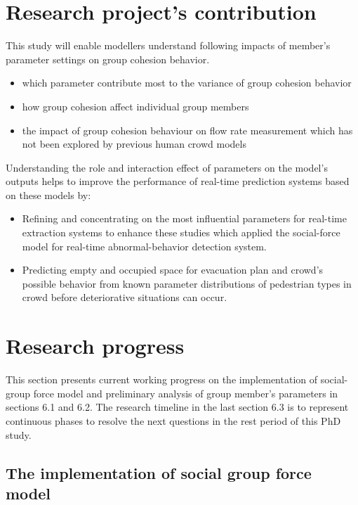 \documentclass[a4paper,11pt,phdthesis,singlespace,twoside]{cssethesis}
\begin{document}
\chapter{Research project's contribution}
\let\cleardoublepage\clearpage
This study will enable modellers understand following impacts of member's parameter settings on group cohesion behavior.
\begin{itemize}
	\item which parameter contribute most to the variance of group cohesion behavior
	\item how group cohesion affect individual group members
	\item the impact of group cohesion behaviour on flow rate measurement which has not been explored by previous human crowd models
\end{itemize}
Understanding the role and interaction effect of parameters on the model’s outputs helps to improve the performance of real-time prediction systems based on these models by: 
\begin{itemize}
	\item Refining and concentrating on the most influential parameters for real-time extraction systems to enhance these studies \cite{Moore2011} which applied the social-force model for real-time abnormal-behavior detection system.
	\item Predicting empty and occupied space for evacuation plan and crowd's possible behavior from known parameter distributions of pedestrian types in crowd before deteriorative situations can occur.
\end{itemize}

\chapter{Research progress}
\let\cleardoublepage\clearpage
This section presents current working progress on the implementation of social-group force model and preliminary analysis of group member’s parameters in sections 6.1 and 6.2. The research timeline in the last section 6.3 is to represent continuous phases to resolve the next questions in the rest period of this PhD study.
\section{The implementation of social group force model}
\end{document}

